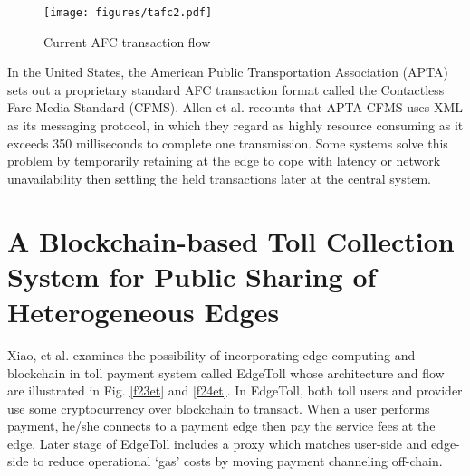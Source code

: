 \documentclass[a4paper,12pt,oneside, utf8x]{report}
\begin{document}
    \begin{figure}[H]
        \centering
        \texttt{[image: figures/tafc2.pdf]}
        \caption{Current AFC transaction flow}
        \label{f22currentaafc}
    \end{figure}
    
In the United States, the American Public Transportation Association (APTA) sets out a proprietary standard AFC transaction format called the Contactless Fare Media Standard (CFMS). Allen et al. \cite{p17} recounts that APTA CFMS uses XML as its messaging protocol, in which they regard as highly resource consuming as it exceeds 350 milliseconds to complete one transmission. Some systems solve this problem by temporarily retaining at the edge to cope with latency or network unavailability \cite{p4} then settling the held transactions later at the central system.

\section{A Blockchain-based Toll Collection System for Public Sharing of Heterogeneous Edges \cite{n18}}

Xiao, et al. \cite{n18} examines the possibility of incorporating edge computing and blockchain in toll payment system called EdgeToll whose architecture and flow are illustrated in Fig. \ref{f23et} and \ref{f24et}. In EdgeToll, both toll users and provider use some cryptocurrency over blockchain to transact. When a user performs payment, he/she connects to a payment edge then pay the service fees at the edge. Later stage of EdgeToll includes a proxy which matches user-side and edge-side to reduce operational ‘gas’ costs by moving payment channeling off-chain.
\end{document}
